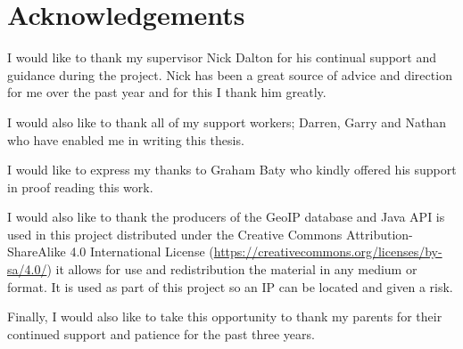 
\chapter{Acknowledgements}

I would like to thank my supervisor Nick Dalton for his continual support and guidance during
the project. Nick has been a great source of
advice and direction for me over the past year and for this I thank him greatly.

I would also like to thank all of my support workers; Darren, Garry and Nathan who have enabled me in writing this thesis.

I would like to express my thanks to Graham Baty who kindly offered his support in proof reading this work.

I would also like to thank the producers of the \citeauthor{javaloc} GeoIP database and Java API is used in this  project  distributed under the Creative Commons Attribution-ShareAlike 4.0 International License (\url{https://creativecommons.org/licenses/by-sa/4.0/}) it allows for use and redistribution the material in any medium or format. It is used as part of this project so an IP can be located and given a risk.



Finally, I would also like to take this opportunity to thank my parents for
their continued support and patience for the past three years.


















